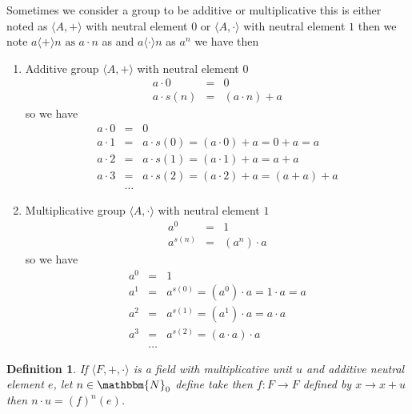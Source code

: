 \documentclass{book}
\newcommand{\upl}{+}
\newtheorem{definition}{Definition}
{\theorembodyfont{\rmfamily}\newtheorem{example}{Example}}
\begin{document}
{{\begin{example}
  
  Sometimes we consider a group to be additive or multiplicative this is
  either noted as $\langle A, + \rangle$ with neutral element $0$ or $\langle
  A, \cdot \rangle$ with neutral element $1$ then we note $a \langle + \rangle
  n \text{ as } a \cdot n$ as and $a \langle \cdot \rangle n$ as $a^n$ we have
  then
  \begin{enumerate}
    \item Additive group $\langle A, + \rangle$ with neutral element $0$
    \begin{eqnarray*}
      a \cdot 0 & = & 0\\
      a \cdot s (n) & = & (a \cdot n) \upl a
    \end{eqnarray*}
    so we have
    \begin{eqnarray*}
      a \cdot 0 & = & 0\\
      a \cdot 1 & = & a \cdot s (0) = (a \cdot 0) \upl a = 0 \upl a = a\\
      a \cdot 2 & = & a \cdot s (1) = (a \cdot 1) \upl a = a \upl a\\
      a \cdot 3 & = & a \cdot s (2) = (a \cdot 2) \upl a = (a \upl a) \upl a\\
      & \ldots & 
    \end{eqnarray*}
    \item Multiplicative group $\langle A, \cdot \rangle$ with neutral element
    $1$
    \begin{eqnarray*}
      a^0 & = & 1\\
      a^{s (n)} & = & (a^n) \cdot a
    \end{eqnarray*}
    so we have
    \begin{eqnarray*}
      a^0 & = & 1\\
      a^1 & = & a^{s (0)} = (a^0) \cdot a = 1 \cdot a = a\\
      a^2 & = & a^{s (1)} = (a^1) \cdot a = a \cdot a\\
      a^3 & = & a^{s (2)} = (a \cdot a) \cdot a\\
      & \ldots & 
    \end{eqnarray*}
  \end{enumerate}
\end{example}

\begin{definition}
  If $\langle F, +, \cdot \rangle$ is a field with multiplicative unit $u$ and
  additive neutral element $e$, let $n \in \mathbbm{N}_0$ define take then $f
  : F \rightarrow F$ defined by $x \rightarrow x + u$ then $n \cdot u = (f)^n
  (e)$. 
\end{definition}

}}
\end{document}
